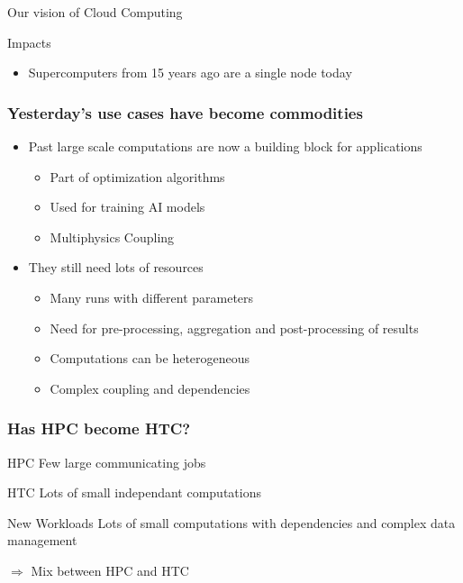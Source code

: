 \documentclass[10pt,aspectratio=1609]{beamer}
\begin{document}
\begin{section}{Our vision of Cloud Computing}
\begin{frame}
    \begin{block}{Impacts}
      \begin{itemize}
        \item Supercomputers from 15 years ago are a single node today
      \end{itemize}
    \end{block}
\end{frame}


\begin{frame}
  \frametitle{Yesterday's use cases have become commodities}

  \begin{itemize}
    \item Past large scale computations are now a building block for applications
    \begin{itemize}
      \item Part of optimization algorithms
      \item Used for training AI models
      \item Multiphysics Coupling
    \end{itemize}

    \item They still need lots of resources
    \begin{itemize}
      \item Many runs with different parameters
      \item Need for pre-processing, aggregation and post-processing of results
      \item Computations can be heterogeneous
      \item Complex coupling and dependencies
    \end{itemize}
  \end{itemize}

\end{frame}

\begin{frame}
  \frametitle{Has HPC become HTC?}

  \begin{block}{HPC}
    Few large communicating jobs 
  \end{block}

  \begin{block}{HTC}
    Lots of small independant computations 
  \end{block}

  \begin{block}{New Workloads}
    Lots of small computations with dependencies and complex data management

    $\Rightarrow$ Mix between HPC and HTC
  \end{block}

\end{frame}
\end{section}
\end{document}
